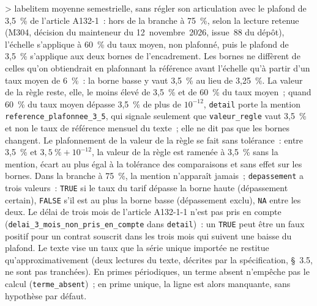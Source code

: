 \documentclass[a4paper,11pt]{article}
\makeatletter
\let\charte@listORI\list
\def\charte@listV{%
  \setlength{\topsep}{0.8ex plus 0.4ex minus 0.4ex}%
  \setlength{\partopsep}{0.4ex plus 0.2ex minus 0.2ex}%
  \charte@parskip=\parskip
  \addtolength{\topsep}{-\charte@parskip}%
  \addtolength{\partopsep}{\charte@parskip}%
  \setlength{\itemsep}{0.4ex plus 0.2ex minus 0.2ex}%
  \setlength{\parsep}{0.4ex plus 0.2ex minus 0.2ex}%
  \ifdim\charte@parskip>\z@
    \setlength{\parsep}{\charte@parskip}%
    \addtolength{\itemsep}{-\charte@parskip}%
  \fi}
\def\list#1#2{\charte@listORI{#1}{\charte@listV #2}}
\renewenvironment{itemize}[1][]{%
  \ifnum\@itemdepth>\thr@@\@toodeep\else
    \advance\@itemdepth\@ne
    \edef\@itemitem{labelitem\romannumeral\the\@itemdepth}%
    \expandafter\list\csname\@itemitem\endcsname
      {\def\makelabel##1{\hss\llap{##1}}\setkeys{charteliste}{#1}}%
  \fi}{\endlist}
\newcommand{\code}[1]{\texttt{\small #1}}
\makeatother
\begin{document}
\begin{itemize}[itemsep=2pt]
  moyenne semestrielle, sans régler son articulation avec le plafond de
  3,5~\% de l'article A132-1~: hors de la branche à 75~\%, selon la
  lecture retenue (M304, décision du mainteneur du 12~novembre~2026,
  issue~88 du dépôt), l'échelle s'applique à 60~\% du taux moyen, non
  plafonné, puis le plafond de 3,5~\% s'applique aux deux bornes de
  l'encadrement. Les bornes ne
  diffèrent de celles qu'on obtiendrait en plafonnant la référence avant
  l'échelle qu'à partir d'un taux moyen de 6~\%~: la borne basse y vaut
  3,5~\% au lieu de 3,25~\%. La valeur de la règle reste, elle, le moins
  élevé de 3,5~\% et de 60~\% du taux moyen~; quand 60~\% du taux moyen
  dépasse 3,5~\% de plus de $10^{-12}$, \code{detail} porte la mention
  \code{reference\_plafonnee\_3\_5}, qui signale seulement que
  \code{valeur\_regle} vaut 3,5~\% et non le taux de référence mensuel du
  texte~; elle ne dit pas que les bornes changent. Le plafonnement de la
  valeur de la règle se fait sans tolérance~: entre 3,5~\% et
  $3{,}5~\% + 10^{-12}$, la valeur de la règle est ramenée à 3,5~\% sans
  la mention, écart au plus égal à la tolérance des comparaisons et sans
  effet sur les bornes. Dans la branche à 75~\%, la mention n'apparaît
  jamais~; \code{depassement} a trois valeurs~: \code{TRUE} si
  le taux du tarif dépasse la borne haute (dépassement certain),
  \code{FALSE} s'il est au plus la borne basse (dépassement exclu), \code{NA}
  entre les deux. Le délai de trois mois de l'article A132-1-1 n'est pas
  pris en compte (\code{delai\_3\_mois\_non\_pris\_en\_compte} dans
  \code{detail})~: un \code{TRUE} peut être un faux positif pour un contrat
  souscrit dans les trois mois qui suivent une baisse du plafond. Le texte
  vise un taux que la série unique importée ne restitue qu'approximativement
  (deux lectures du texte, décrites par la spécification, §~3.5, ne sont
pas tranchées). En
  primes périodiques, un terme absent n'empêche pas le calcul
  (\code{terme\_absent})~; en prime unique, la ligne est alors manquante,
  sans hypothèse par défaut.
\end{itemize}
\end{document}
